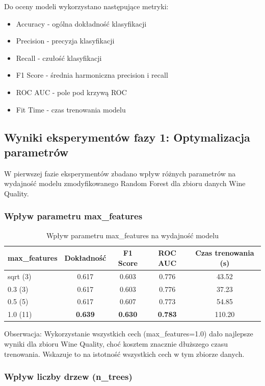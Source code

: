 \documentclass[11pt,a4paper]{article}
\begin{document}
Do oceny modeli wykorzystano następujące metryki:
\begin{itemize}
    \item Accuracy - ogólna dokładność klasyfikacji
    \item Precision - precyzja klasyfikacji
    \item Recall - czułość klasyfikacji
    \item F1 Score - średnia harmoniczna precision i recall
    \item ROC AUC - pole pod krzywą ROC
    \item Fit Time - czas trenowania modelu
\end{itemize}

\subsection{Wyniki eksperymentów fazy 1: Optymalizacja parametrów}

W pierwszej fazie eksperymentów zbadano wpływ różnych parametrów na wydajność modelu zmodyfikowanego Random Forest dla zbioru danych Wine Quality.

\subsubsection{Wpływ parametru max\_features}

\begin{table}[H]
\centering
\caption{Wpływ parametru max\_features na wydajność modelu}
\label{tab:max_features}
\begin{tabular}{lcccc}
\toprule
max\_features & Dokładność & F1 Score & ROC AUC & Czas trenowania (s) \\
\midrule
sqrt (3) & 0.617 & 0.603 & 0.776 & 43.52 \\
0.3 (3) & 0.617 & 0.603 & 0.776 & 37.23 \\
0.5 (5) & 0.617 & 0.607 & 0.773 & 54.85 \\
1.0 (11) & \textbf{0.639} & \textbf{0.630} & \textbf{0.783} & 110.20 \\
\bottomrule
\end{tabular}
\end{table}

Obserwacja: Wykorzystanie wszystkich cech (max\_features=1.0) dało najlepsze wyniki dla zbioru Wine Quality, choć kosztem znacznie dłuższego czasu trenowania. Wskazuje to na istotność wszystkich cech w tym zbiorze danych.

\subsubsection{Wpływ liczby drzew (n\_trees)}
\end{document}
